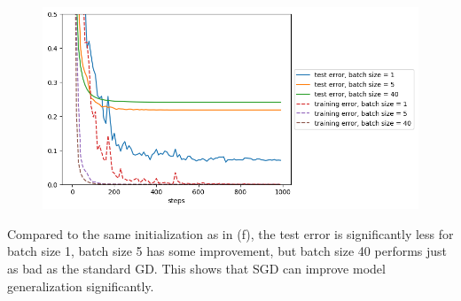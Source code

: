 
\begin{answer}
\begin{figure}[H]
    \centering
    \includegraphics[width = 15cm]{implicitreg/implicitreg_quadratic_batchsize.png}
\end{figure}
Compared to the same initialization as in (f), the test error is significantly less for batch size 1, batch size 5 has some improvement, but batch size 40 performs just as bad as the standard GD. This shows that SGD can improve model generalization significantly.
\end{answer}